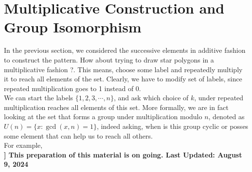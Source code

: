 \documentclass{article}
\begin{document}
\section{Multiplicative Construction and Group Isomorphism}
In the previous section, we considered the successive elements in additive fashion to construct the pattern. How about trying to draw star polygons in a multiplicative fashion ?. This means, choose some label and repeatedly multiply it to reach all elements of the set. Clearly, we have to modify set of labels, since repeated multiplication goes to 1 instead of 0.\\[2mm]
We can start the labels $\{1,2,3,\cdots,n\}$, and ask which choice of $k$, under repeated multiplication reaches all elements of this set. More formally, we are in fact looking at the set that forms a group under multiplication modulo $n$, denoted as $U(n) = \{x: \gcd(x,n) =1\}$, indeed asking, when is this group cyclic or posses some element that can help us to reach all others.\\[2mm]
For example, \\[4mm]
\textbf{]  This preparation of this material is on going. Last Updated: August 9, 2024}
\end{document}
